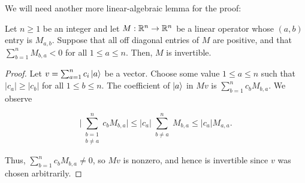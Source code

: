 We will need another more linear-algebraic lemma for the proof:

\begin{lem}\label{linear-algebra-lemma} Let $n\geq 1$ be an integer and let $M:{\mathbb R}^n\to {\mathbb R}^n$ be a linear operator whose $(a,b)$ entry is $M_{a,b}$. Suppose that all off diagonal entries of $M$ are positive, and that $\sum_{b=1}^n M_{b,a}<0$ for all $1\leq a\leq n$. Then, $M$ is invertible.
\end{lem}
\begin{proof} Let $v=\sum_{a=1}^nc_i\ket{a}$ be a vector. Choose some value $1\leq a\leq n$ such that $|c_a|\geq |c_b|$ for all $1\leq b \leq n$. The coefficient of $\ket{a}$ in $Mv$ is $\sum_{b=1}^n c_b M_{b,a}$. We observe

$$\big|\sum_{\substack{b=1 \\ b\neq a}}^n c_b M_{b,a}\big|\leq |c_a|\sum_{\substack{b\neq a}}^{n}M_{b,a}\leq |c_a|M_{a,a}.$$

Thus, $\sum_{b=1}^n c_b M_{b,a}\neq 0$, so $Mv$ is nonzero, and hence is invertible since $v$ was chosen arbitrarily.
\end{proof}

